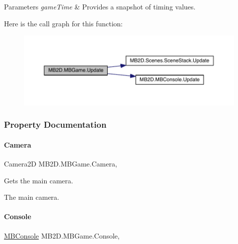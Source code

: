 \begin{DoxyParams}{Parameters}
{\em game\+Time} & Provides a snapshot of timing values.\\
\hline
\end{DoxyParams}
Here is the call graph for this function\+:
\nopagebreak
\begin{figure}[H]
\begin{center}
\leavevmode
\includegraphics[width=350pt]{class_m_b2_d_1_1_m_b_game_a82968a66f75f9c437074ce7bfd468455_cgraph}
\end{center}
\end{figure}


\subsubsection{Property Documentation}
\hypertarget{class_m_b2_d_1_1_m_b_game_adec48f512c50332353b12a569630defe}{}\label{class_m_b2_d_1_1_m_b_game_adec48f512c50332353b12a569630defe} 
\paragraph{\texorpdfstring{Camera}{Camera}}
{\footnotesize\ttfamily Camera2D M\+B2\+D.\+M\+B\+Game.\+Camera\hspace{0.3cm}{\ttfamily [static]}, {\ttfamily [get]}}



Gets the main camera. 

The main camera.\hypertarget{class_m_b2_d_1_1_m_b_game_a0db7935dd8a9f15b2dce1031920a4127}{}\label{class_m_b2_d_1_1_m_b_game_a0db7935dd8a9f15b2dce1031920a4127} 
\paragraph{\texorpdfstring{Console}{Console}}
{\footnotesize\ttfamily \hyperlink{class_m_b2_d_1_1_m_b_console}{M\+B\+Console} M\+B2\+D.\+M\+B\+Game.\+Console\hspace{0.3cm}{\ttfamily [static]}, {\ttfamily [get]}}



